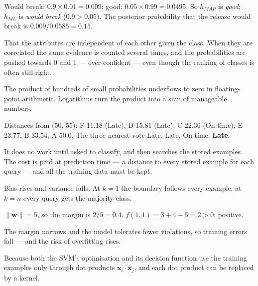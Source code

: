 \begin{ans}
  \item Would break: $0.9 \times 0.01 = 0.009$; good: $0.05 \times 0.99 = 0.0495$. So
        $h_{MAP}$ is \emph{good}; $h_{ML}$ is \emph{would break} ($0.9 > 0.05$). The
        posterior probability that the release would break is $0.009/0.0585 = 0.15$.
  \item That the attributes are independent of each other given the class. When they
        are correlated the same evidence is counted several times, and the
        probabilities are pushed towards 0 and 1 --- over-confident --- even though the
        ranking of classes is often still right.
  \item The product of hundreds of small probabilities underflows to zero in
        floating-point arithmetic. Logarithms turn the product into a sum of
        manageable numbers.
\end{ans}

\begin{ans}
  \item Distances from (50, 55): F 11.18 (Late), D 15.81 (Late), C 22.36 (On time),
        E 23.77, B 33.54, A 50.0. The three nearest vote Late, Late, On time:
        \textbf{Late}.
  \item It does no work until asked to classify, and then searches the stored examples.
        The cost is paid at prediction time --- a distance to every stored example for
        each query --- and all the training data must be kept.
  \item Bias rises and variance falls. At $k = 1$ the boundary follows every example; at
        $k = n$ every query gets the majority class.
\end{ans}

\begin{ans}
  \item $\|\mathbf{w}\| = 5$, so the margin is $2/5 = 0.4$. $f(1, 1) = 3 + 4 - 5 = 2 > 0$:
        positive.
  \item The margin narrows and the model tolerates fewer violations, so training
        errors fall --- and the risk of overfitting rises.
  \item Because both the SVM's optimisation and its decision function use the training
        examples only through dot products $\mathbf{x}_i \cdot \mathbf{x}_j$, and each dot
        product can be replaced by a kernel.
\end{ans}

